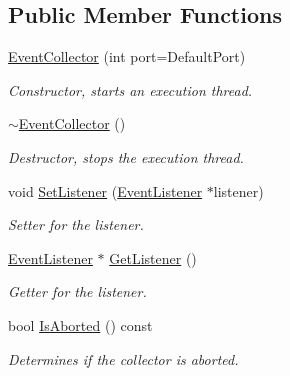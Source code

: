 \subsection*{Public Member Functions}
\begin{DoxyCompactItemize}
\item 
\hyperlink{class_event_collector_a36de1ef281ba1c800a0b83ba18233f57}{Event\-Collector} (int port=Default\-Port)
\begin{DoxyCompactList}\small\item\em Constructor, starts an execution thread. \end{DoxyCompactList}\item 
\hypertarget{class_event_collector_a557c234313d714eb7a07b595a002b324}{\hyperlink{class_event_collector_a557c234313d714eb7a07b595a002b324}{$\sim$\-Event\-Collector} ()}\label{class_event_collector_a557c234313d714eb7a07b595a002b324}

\begin{DoxyCompactList}\small\item\em Destructor, stops the execution thread. \end{DoxyCompactList}\item 
void \hyperlink{class_event_collector_a42a1e721b13f06f5733aabd03804a165}{Set\-Listener} (\hyperlink{class_event_listener}{Event\-Listener} $\ast$listener)
\begin{DoxyCompactList}\small\item\em Setter for the listener. \end{DoxyCompactList}\item 
\hyperlink{class_event_listener}{Event\-Listener} $\ast$ \hyperlink{class_event_collector_a5897ca33a4baf5fb3cd2a32ec411af1f}{Get\-Listener} ()
\begin{DoxyCompactList}\small\item\em Getter for the listener. \end{DoxyCompactList}\item 
bool \hyperlink{class_event_collector_a6ca1544d70c43e753ee40bc60937e27e}{Is\-Aborted} () const 
\begin{DoxyCompactList}\small\item\em Determines if the collector is aborted. \end{DoxyCompactList}\end{DoxyCompactItemize}
